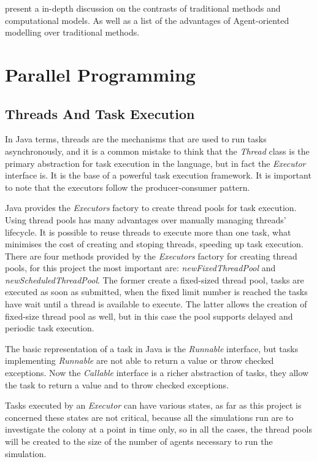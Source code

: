 \citeauthor{miller2007complex} present a in-depth discussion on the contrasts of traditional methods and computational models. As well as a list of the advantages of Agent-oriented modelling over traditional methods. 

\section{Parallel Programming}

\subsection{Threads And Task Execution}
\label{subsec:threads-task-exec}

In Java terms, threads are the mechanisms that are used to run tasks asynchronously, and it is a common mistake to think that the \emph{Thread} class is the primary abstraction for task execution in the language, but in fact the \emph{Executor} interface is. It is the base of a powerful task execution framework. It is important to note that the executors follow the producer-consumer pattern.

Java provides the \emph{Executors} factory to create thread pools for task execution. Using thread pools has many advantages over manually managing threads' lifecycle. It is possible to reuse threads to execute more than one task, what minimises the cost of creating and stoping threads, speeding up task execution. There are four methods provided by the \emph{Executors} factory for creating thread pools, for this project the most important are: \emph{newFixedThreadPool} and \emph{newScheduledThreadPool}. The former create a fixed-sized thread pool, tasks are executed as soon as submitted, when the fixed limit number is reached the tasks have wait until a thread is available to execute. The latter allows the creation of fixed-size thread pool as well, but in this case the pool supports delayed and periodic task execution.

The basic representation of a task in Java is the \emph{Runnable} interface, but tasks implementing \emph{Runnable} are not able to return a value or throw checked exceptions.\cite{goetz2006java} Now the \emph{Callable} interface is a richer abstraction of tasks, they allow the task to return a value and to throw checked exceptions. 

Tasks executed by an \emph{Executor} can have various states, as far as this project is concerned these states are not critical, because all the simulations run are to investigate the colony at a point in time only, so in all the cases, the thread pools will be created to the size of the number of agents necessary to run the simulation.


